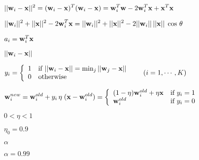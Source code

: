 \documentclass{article}
\def\lthtmlcheckvsize{\ifdim\ht\sizebox<\vsize 
  \ifdim\wd\sizebox<\hsize\expandafter\hfill\fi \expandafter\vfill
  \else\expandafter\vss\fi}%
\begin{document}
{\newpage\clearpage
{}%
$\displaystyle ||{\bf w}_i-{\bf x}||^2
=({\bf w}_i-{\bf x})^T({\bf w}_i-{\bf x})
={\bf w}_i^T{\bf w}-2{\bf w}_i^T{\bf x}+{\bf x}^T{\bf x}$%
\lthtmlindisplaymathZ
\lthtmlcheckvsize\clearpage}

{\newpage\clearpage
{}%
$\displaystyle ||{\bf w}_i||^2+||{\bf x}||^2-2{\bf w}_i^T{\bf x}
=||{\bf w}_i||^2+||{\bf x}||^2-2||{\bf w}_i||\,||{\bf x}||\;\cos\,\theta$%
\lthtmlindisplaymathZ
\lthtmlcheckvsize\clearpage}

{\newpage\clearpage
{}%
$ a_i={\bf w}_i^T{\bf x}$%
\lthtmlindisplaymathZ
\lthtmlcheckvsize\clearpage}

{\newpage\clearpage
{}%
$ ||{\bf w}_i-{\bf x}||$%
\lthtmlindisplaymathZ
\lthtmlcheckvsize\clearpage}

{\newpage\clearpage
{}%
$\displaystyle y_i=\left\{ \begin{array}{ll}
1 & \mbox{if } ||{\bf w}_i-{\bf x}||=\min_j||{\bf w}_j-{\bf x}||
\\0 & \mbox{otherwise} \end{array}  \right.\;\;\;\;\;\;(i=1,\cdots,K)$%
\lthtmlindisplaymathZ
\lthtmlcheckvsize\clearpage}

{\newpage\clearpage
{}%
$\displaystyle {\bf w}_i^{new}={\bf w}_i^{old}+y_i\,\eta\;({\bf x}-{\bf w}_i^{old})
=\left\{\begin{array}{ll}(1-\eta){\bf w}_i^{old}
+\eta {\bf x}& \mbox{if }y_i=1\\{\bf w}_i^{old}& \mbox{if }y_i=0
\end{array} \right.$%
\lthtmlindisplaymathZ
\lthtmlcheckvsize\clearpage}

{\newpage\clearpage
{}%
$ 0<\eta<1$%
\lthtmlindisplaymathZ
\lthtmlcheckvsize\clearpage}

{\newpage\clearpage
{}%
$ \eta_0=0.9$%
\lthtmlindisplaymathZ
\lthtmlcheckvsize\clearpage}

{\newpage\clearpage
{}%
$ \alpha$%
\lthtmlindisplaymathZ
\lthtmlcheckvsize\clearpage}

{\newpage\clearpage
{}%
$ \alpha=0.99$%
\lthtmlindisplaymathZ
\lthtmlcheckvsize\clearpage}
\end{document}
